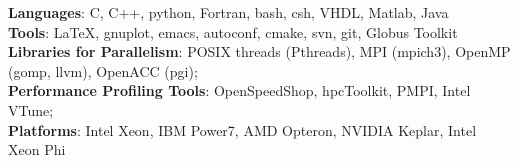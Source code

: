 {{\bf Languages}: C, C++, python, Fortran, bash, csh, VHDL, Matlab, Java}\\
{{\bf Tools}: LaTeX, gnuplot, emacs, autoconf, cmake, svn, git, Globus Toolkit}\\
{{\bf Libraries for Parallelism}: POSIX threads (Pthreads), MPI (mpich3), OpenMP (gomp, llvm), OpenACC (pgi)}; \\
{{\bf Performance Profiling Tools}: OpenSpeedShop, hpcToolkit, PMPI, Intel VTune}; \\
{{\bf Platforms}: {Intel Xeon, IBM Power7, AMD Opteron, NVIDIA Keplar, Intel Xeon Phi}}

